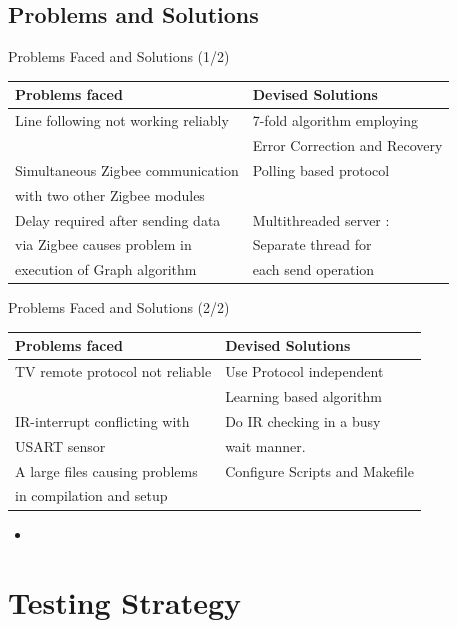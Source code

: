 \documentclass{beamer}
\begin{document}
\subsection{Problems and Solutions}
\begin{frame}{Problems Faced and Solutions (1/2)}
\begin{tabular}{|l|l|}
\hline
\textbf{Problems faced} & \textbf{Devised Solutions} \\
\hline
\hline
Line following not working reliably & 7-fold algorithm employing \\
& Error Correction and Recovery \\
\hline
Simultaneous Zigbee communication & Polling based protocol \\
with two other Zigbee modules & \\
\hline
Delay required after sending data & Multithreaded server : \\
via Zigbee causes problem in & Separate thread for \\
execution of Graph algorithm & each send operation \\
\hline
\end{tabular}
\end{frame}

\begin{frame}{Problems Faced and Solutions (2/2)}
\begin{tabular}{|l|l|}
\hline
\textbf{Problems faced} & \textbf{Devised Solutions} \\
\hline
\hline
TV remote protocol not reliable & Use Protocol independent \\
& Learning based algorithm \\
\hline
IR-interrupt conflicting with & Do IR checking in a busy \\
USART sensor & wait manner.\\
\hline
A large files causing problems & Configure Scripts and Makefile \\
in compilation and setup & \\
\hline
\end{tabular}
\begin{itemize}
\item[]
\end{itemize}
\end{frame}

\section{Testing Strategy}
\end{document}
